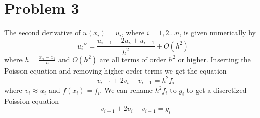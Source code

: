 \documentclass[english,notitlepage]{revtex4-2}  %
\begin{document}
\section*{Problem 3}
The second derivative of $u(x_i)=u_i$, where $i=1,2\ldots n$, is given numerically by
\begin{equation}
	u_i'' = \frac{u_{i+1}-2u_i+u_{i-1}}{h^2}+O(h^2) 
\end{equation}
where $h=\frac{x_{n}-x_1}{n}$ and $O(h^2)$ are all terms of order $h^2$ or higher. Inserting the Poisson equation and removing higher order terms we get the equation
\begin{equation}
	-v_{i+1}+2v_i-v_{i-1}=h^2f_i
\end{equation}
where $v_i\approx u_i$ and $f(x_i)=f_i$. We can rename $h^2f_i$ to $g_i$ to get a discretized Poission equation
\begin{equation}
	-v_{i+1}+2v_i-v_{i-1}=g_i
\end{equation}
\end{document}
